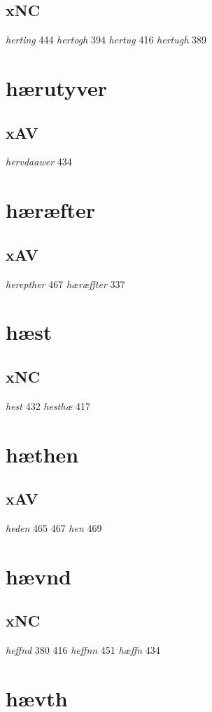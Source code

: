 \documentclass[a4paper,twocolumn]{article}
\begin{document}
\subsection{xNC}
\label{sec:orgc6caf7a}
\emph{herting} 444 \emph{hertogh} 394 \emph{hertug} 416 \emph{hertugh} 389 
\section{hærutyver}
\label{sec:orgcbfdfb1}
\subsection{xAV}
\label{sec:orgda9ded4}
\emph{hervdaawer} 434 
\section{hæræfter}
\label{sec:org5887f5e}
\subsection{xAV}
\label{sec:org96a57c3}
\emph{herepther} 467 \emph{hæræffter} 337 
\section{hæst}
\label{sec:orgf186da4}
\subsection{xNC}
\label{sec:org81c12ac}
\emph{hest} 432 \emph{hesthæ} 417 
\section{hæthen}
\label{sec:org8a9f599}
\subsection{xAV}
\label{sec:org08ca0ac}
\emph{heden} 465 467 \emph{hen} 469 
\section{hævnd}
\label{sec:orgdd4897c}
\subsection{xNC}
\label{sec:org72ee1ca}
\emph{heffnd} 380 416 \emph{heffnn} 451 \emph{hæffn} 434 
\section{hævth}
\label{sec:org7bf1332}
\end{document}
